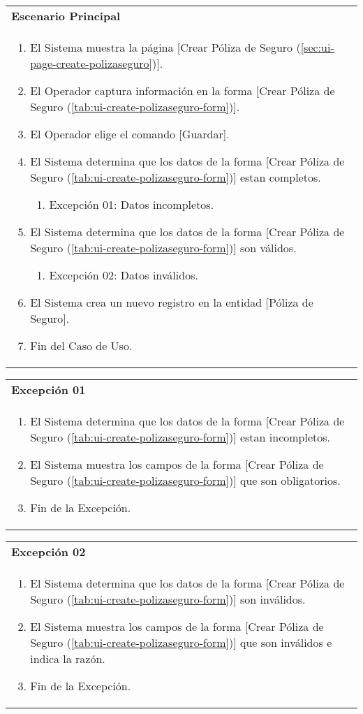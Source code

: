 \begin{tabular}{ p{15.5cm} }
	\textbf{Escenario Principal} \\
	\begin{enumerate}
		\item El Sistema muestra la página [Crear Póliza de Seguro (\ref{sec:ui-page-create-polizaseguro})].
		\item El Operador captura información en la forma [Crear Póliza de Seguro (\ref{tab:ui-create-polizaseguro-form})].
		\item El Operador elige el comando [Guardar].
		\item El Sistema determina que los datos de la forma [Crear Póliza de Seguro (\ref{tab:ui-create-polizaseguro-form})] estan completos.
			\begin{enumerate}
				\item Excepción 01: Datos incompletos.
			\end{enumerate}
		\item El Sistema determina que los datos de la forma [Crear Póliza de Seguro (\ref{tab:ui-create-polizaseguro-form})] son válidos.
			\begin{enumerate}
				\item Excepción 02: Datos inválidos.
			\end{enumerate}
		\item El Sistema crea un nuevo registro en la entidad [Póliza de Seguro].
		\item Fin del Caso de Uso.
	\end{enumerate}
\end{tabular}

\begin{tabular}{ p{15.5cm} }
	\textbf{Excepción 01} \\
	\begin{enumerate}
		\item El Sistema determina que los datos de la forma [Crear Póliza de Seguro (\ref{tab:ui-create-polizaseguro-form})] estan incompletos.
		\item El Sistema muestra los campos de la forma [Crear Póliza de Seguro (\ref{tab:ui-create-polizaseguro-form})] que son obligatorios.
		\item Fin de la Excepción.
	\end{enumerate}
\end{tabular}

\begin{tabular}{ p{15.5cm} }
	\textbf{Excepción 02} \\
	\begin{enumerate}
		\item El Sistema determina que los datos de la forma [Crear Póliza de Seguro (\ref{tab:ui-create-polizaseguro-form})] son inválidos.
		\item El Sistema muestra los campos de la forma [Crear Póliza de Seguro (\ref{tab:ui-create-polizaseguro-form})] que son inválidos e indica la razón.
		\item Fin de la Excepción.
	\end{enumerate}
\end{tabular}


